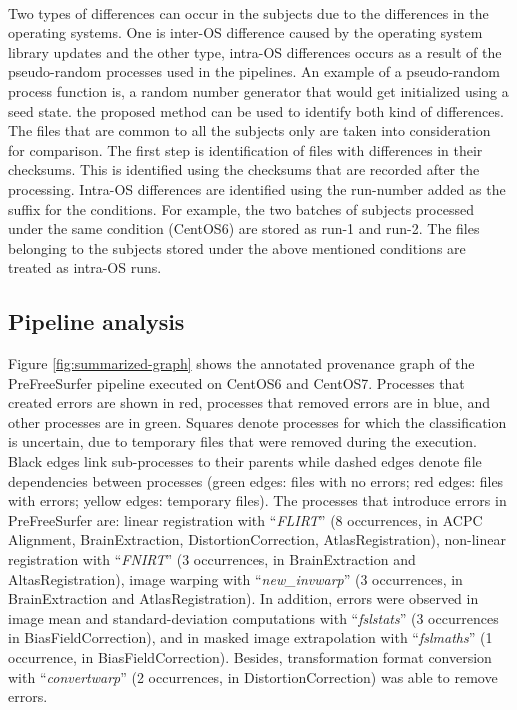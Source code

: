 \documentclass{article}
\begin{document}
\paragraph{}
Two types of differences can occur in the subjects due to the differences in the operating systems. 
One is inter-OS difference caused by the operating system library updates and the other type,
 intra-OS differences occurs as a result of the pseudo-random processes used in the pipelines.
 An example of a pseudo-random process function is, a random number generator that would get initialized 
using a seed state. the proposed method can be used to identify both kind of differences. 
The files that are common to all the subjects only are taken into consideration for comparison. The first step
 is identification of files with differences in their checksums. This is identified using the checksums that are
 recorded after the processing. Intra-OS differences are identified using the run-number added as the suffix for
 the conditions. For example, the two batches of subjects processed under the same condition (CentOS6) are stored 
as run-1 and run-2. The files belonging to the subjects stored under the above mentioned conditions are treated as intra-OS runs.



\subsection{Pipeline analysis}

Figure \ref{fig:summarized-graph} shows the annotated provenance graph of the
PreFreeSurfer pipeline executed on CentOS6 and CentOS7.  Processes
that created errors are shown in red, processes that removed errors
are in blue, and other processes are in green.  Squares denote
processes for which the classification is uncertain, due to temporary
files that were removed during the execution. Black edges link
sub-processes to their parents while dashed edges denote file
dependencies between processes (green edges: files with no errors; red
edges: files with errors; yellow edges: temporary files).  The
processes that introduce errors in PreFreeSurfer are: linear
registration with “\emph{FLIRT}” (8 occurrences, in ACPC Alignment,
BrainExtraction, DistortionCorrection, AtlasRegistration), non-linear
registration with “\emph{FNIRT}” (3 occurrences, in BrainExtraction
and AltasRegistration), image warping with “\emph{new\_invwarp}” (3
occurrences, in BrainExtraction and AtlasRegistration).  In addition,
errors were observed in image mean and standard-deviation computations
with “\emph{fslstats}” (3 occurrences in BiasFieldCorrection), and in
masked image extrapolation with “\emph{fslmaths}” (1 occurrence, in
BiasFieldCorrection).  Besides, transformation format conversion with
“\emph{convertwarp}” (2 occurrences, in DistortionCorrection) was able
to remove errors.
\end{document}
